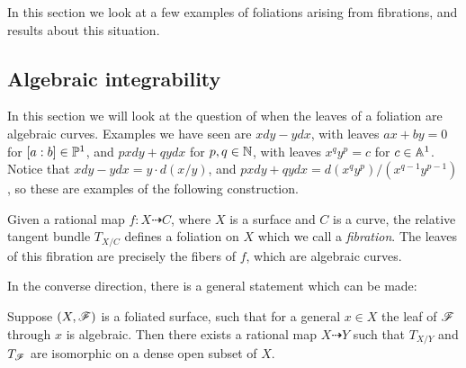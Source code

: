 
In this section we look at a few examples of foliations arising from fibrations,
and results about this situation.


\subsection{Algebraic integrability}

In this section we will look at the question of when the leaves of a foliation
are algebraic curves. Examples we have seen are $xdy-ydx$, with leaves $ax+by=0$
for $[a:b]\in\P^1$, and $pxdy+qydx$ for $p,q\in\N$, with leaves $x^qy^p=c$ for
$c\in\A^1$. Notice that $xdy-ydx=y\cdot d(x/y)$, and
$pxdy+qydx=d(x^qy^p)/(x^{q-1}y^{p-1})$, so these are examples of the following
construction.

\begin{definition}
    Given a rational map $f:X\dashrightarrow C$, where $X$ is a surface and $C$
    is a curve, the relative tangent bundle $T_{X/C}$ defines a foliation on $X$
    which we call a \emph{fibration}. The leaves of this fibration are precisely
    the fibers of $f$, which are algebraic curves.
\end{definition}

In the converse direction, there is a general statement which can be made:

\begin{proposition}
    Suppose $(X,\scrF)$ is a foliated surface, such that for a general $x\in X$
    the leaf of $\scrF$ through $x$ is algebraic. Then there exists a rational
    map $X\dashrightarrow Y$ such that $T_{X/Y}$ and $T_\scrF$ are isomorphic on
    a dense open subset of $X$.
\end{proposition}


